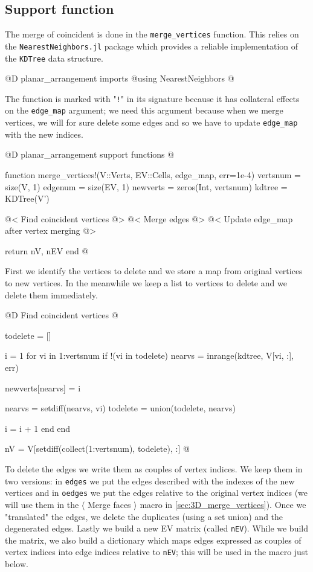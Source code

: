 \subsection{Support function}
The merge of coincident is done in the \texttt{merge\_vertices}
function. This relies on the \texttt{NearestNeighbors.jl} package\cite{NearestNeighbors}
which provides a reliable implementation of the \texttt{KDTree} data structure.

@D planar\_arrangement imports
@{using NearestNeighbors
@}

The function is marked with "\texttt{!}" in its signature 
because it has collateral effects
on the \texttt{edge\_map} argument; we need this argument because when we
merge vertices, we will for sure delete some edges and so we have
to update \texttt{edge\_map} with the new indices.

@D planar\_arrangement support functions
@{function merge_vertices!(V::Verts, EV::Cells, edge_map, err=1e-4)
    vertsnum = size(V, 1)
    edgenum = size(EV, 1)
    newverts = zeros(Int, vertsnum)
    kdtree = KDTree(V')

    @< Find coincident vertices @>
    @< Merge edges @>
    @< Update edge\_map after vertex merging @>

    return nV, nEV
end
@}

First we identify the vertices to delete and we store a map
from original vertices to new vertices. In the meanwhile
we keep a list to vertices to delete and we delete them 
immediately.

@D Find coincident vertices
@{todelete = []

i = 1
for vi in 1:vertsnum
    if !(vi in todelete)
        nearvs = inrange(kdtree, V[vi, :], err)

        newverts[nearvs] = i

        nearvs = setdiff(nearvs, vi)
        todelete = union(todelete, nearvs)

        i = i + 1
    end
end

nV = V[setdiff(collect(1:vertsnum), todelete), :]
@}

To delete the edges we write them as couples of vertex
indices. We keep them in two versions: in \texttt{edges}
we put the edges described with the indexes of the new vertices
and in \texttt{oedges} we put the edges relative to the original vertex
indices (we will use them in the $\langle$ Merge faces $\rangle$ 
macro in \ref{sec:3D_merge_vertices}). Once we "translated"
the edges, we delete the duplicates (using a set union) and the
degenerated edges. Lastly we build a new EV matrix 
(called \texttt{nEV}). While we
build the matrix, we also build a dictionary which maps edges expressed
as couples of vertex indices into edge indices relative to \texttt{nEV};
this will be used in the macro just below.

